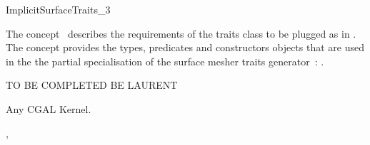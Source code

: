 

\begin{ccRefConcept}{ImplicitSurfaceTraits_3}


\ccDefinition
  
The concept \ccRefName\  describes the requirements of the traits class to
be plugged  as  in .
The concept provides the types, predicates and constructors objects
that are  used in the 
the partial specialisation  of 
the  surface mesher traits generator~:
.



TO BE COMPLETED BE LAURENT



\ccTypes

\ccGlue
{}
\ccGlue
{}






\ccHasModels

Any CGAL Kernel.


\ccSeeAlso

,\\






\end{ccRefConcept}


